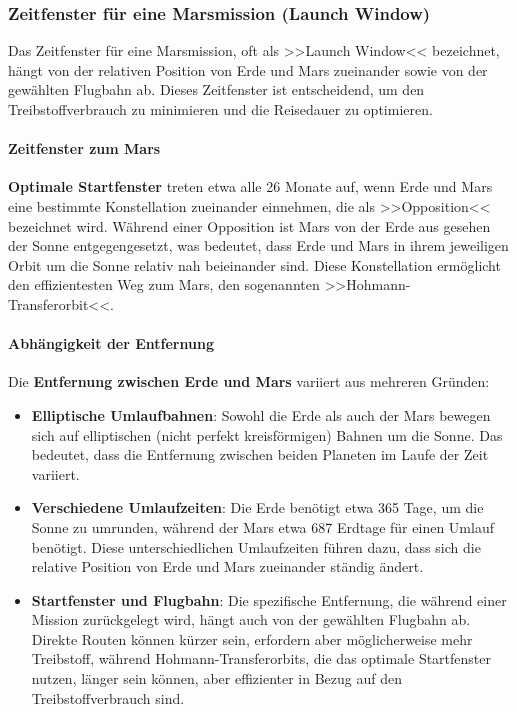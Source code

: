 \documentclass{vorlage-design-main}
\begin{document}
\hypertarget{zeitfenster-fuxfcr-eine-marsmission-launch-window}{%
\subsubsection{Zeitfenster für eine Marsmission (Launch
Window)}\label{zeitfenster-fuer-eine-marsmission-launch-window}}

Das Zeitfenster für eine Marsmission, oft als >>Launch Window<<
bezeichnet, hängt von der relativen Position von Erde und Mars
zueinander sowie von der gewählten Flugbahn ab. Dieses Zeitfenster ist
entscheidend, um den Treibstoffverbrauch zu minimieren und die
Reisedauer zu optimieren.

\hypertarget{zeitfenster-zum-mars}{%
\paragraph{Zeitfenster zum Mars}\label{zeitfenster-zum-mars}}

\textbf{Optimale Startfenster} treten etwa alle 26 Monate auf, wenn Erde
und Mars eine bestimmte Konstellation zueinander einnehmen, die als
>>Opposition<< bezeichnet wird. Während einer Opposition ist Mars von
der Erde aus gesehen der Sonne entgegengesetzt, was bedeutet, dass Erde
und Mars in ihrem jeweiligen Orbit um die Sonne relativ nah beieinander
sind. Diese Konstellation ermöglicht den effizientesten Weg zum Mars,
den sogenannten >>Hohmann-Transferorbit<<.

\hypertarget{abhuxe4ngigkeit-der-entfernung}{%
\paragraph{Abhängigkeit der
Entfernung}\label{abhaengigkeit-der-entfernung}}

Die \textbf{Entfernung zwischen Erde und Mars} variiert aus mehreren
Gründen:

\begin{itemize}

\item
  \textbf{Elliptische Umlaufbahnen}: Sowohl die Erde als auch der Mars
  bewegen sich auf elliptischen (nicht perfekt kreisförmigen) Bahnen um
  die Sonne. Das bedeutet, dass die Entfernung zwischen beiden Planeten
  im Laufe der Zeit variiert.
\item
  \textbf{Verschiedene Umlaufzeiten}: Die Erde benötigt etwa 365 Tage,
  um die Sonne zu umrunden, während der Mars etwa 687 Erdtage für einen
  Umlauf benötigt. Diese unterschiedlichen Umlaufzeiten führen dazu,
  dass sich die relative Position von Erde und Mars zueinander ständig
  ändert.
\item
  \textbf{Startfenster und Flugbahn}: Die spezifische Entfernung, die
  während einer Mission zurückgelegt wird, hängt auch von der gewählten
  Flugbahn ab. Direkte Routen können kürzer sein, erfordern aber
  möglicherweise mehr Treibstoff, während Hohmann-Transferorbits, die
  das optimale Startfenster nutzen, länger sein können, aber effizienter
  in Bezug auf den Treibstoffverbrauch sind.
\end{itemize}
\end{document}
